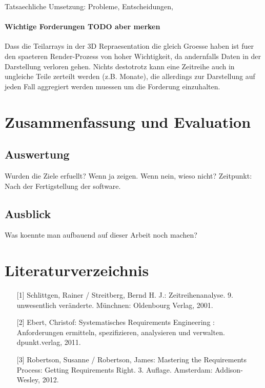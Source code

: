 \documentclass[12pt]{article}
\begin{document}
		Tatsaechliche Umsetzung: Probleme, Entscheidungen, 
	
				\paragraph{Wichtige Forderungen TODO aber merken}
				Dass die Teilarrays in der 3D Repraesentation die gleich Groesse haben ist fuer den spaeteren Render-Prozess von hoher Wichtigkeit, da andernfalls Daten in der Darstellung verloren gehen. Nichts destotrotz kann eine Zeitreihe auch in ungleiche Teile zerteilt werden (z.B. Monate), die allerdings zur Darstellung auf jeden Fall aggregiert werden muessen um die Forderung einzuhalten.
\section{Zusammenfassung und Evaluation}
	\subsection{Auswertung}
		Wurden die Ziele erfuellt? Wenn ja zeigen. Wenn nein, wieso nicht?
		Zeitpunkt: Nach der Fertigstellung der software.
	\subsection{Ausblick}
		Was koennte man aufbauend auf dieser Arbeit noch machen?
	
\newpage
\thispagestyle{empty}
\section*{Literaturverzeichnis}

\begin{itemize}
  \item[] [1] Schlittgen, Rainer / Streitberg, Bernd H. J.: Zeitreihenanalyse.
  9. unwesentlich veränderte. Münchnen: Oldenbourg Verlag, 2001.
  \item[] [2] Ebert, Christof: Systematisches Requirements Engineering :
  Anforderungen ermitteln, spezifizieren, analysieren und verwalten.
  dpunkt.verlag, 2011.
  \item[] [3] Robertson, Susanne / Robertson, James: Mastering the Requirements
  Process: Getting Requirements Right. 3. Auflage. Amsterdam: Addison-Wesley,
  2012.
\end{itemize}

\newpage
\thispagestyle{empty}
\hspace{15cm}
\end{document}
